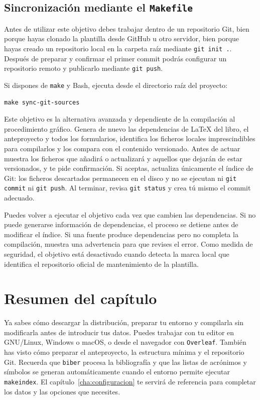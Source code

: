 \subsection{Sincronización mediante el \texttt{Makefile}}

Antes de utilizar este objetivo debes trabajar dentro de un repositorio Git, bien porque hayas clonado la plantilla desde GitHub u otro servidor, bien porque hayas creado un repositorio local en la carpeta raíz mediante \texttt{git init .}. Después de preparar y confirmar el primer commit podrás configurar un repositorio remoto y publicarlo mediante \texttt{git push}.

Si dispones de \texttt{make} y Bash, ejecuta desde el directorio raíz del proyecto:

\begin{verbatim}
make sync-git-sources
\end{verbatim}

Este objetivo es la alternativa avanzada y dependiente de la compilación al procedimiento gráfico. Genera de nuevo las dependencias de \LaTeX{} del libro, el anteproyecto y todos los formularios, identifica los ficheros locales imprescindibles para compilarlos y los compara con el contenido versionado. Antes de actuar muestra los ficheros que añadirá o actualizará y aquellos que dejarán de estar versionados, y te pide confirmación. Si aceptas, actualiza únicamente el índice de Git: los ficheros descartados permanecen en el disco y no se ejecutan ni \texttt{git commit} ni \texttt{git push}. Al terminar, revisa \texttt{git status} y crea tú mismo el commit adecuado.

Puedes volver a ejecutar el objetivo cada vez que cambien las dependencias. Si no puede generarse información de dependencias, el proceso se detiene antes de modificar el índice. Si una fuente produce dependencias pero no completa la compilación, muestra una advertencia para que revises el error. Como medida de seguridad, el objetivo está desactivado cuando detecta la marca local que identifica el repositorio oficial de mantenimiento de la plantilla.

\section{Resumen del capítulo}
\label{sec:resumen-primeros-pasos}

Ya sabes cómo descargar la distribución, preparar tu entorno y compilarla sin modificarla antes de introducir tus datos. Puedes trabajar con tu editor en GNU/Linux, Windows o macOS, o desde el navegador con \texttt{Overleaf}. También has visto cómo preparar el anteproyecto, la estructura mínima y el repositorio Git. Recuerda que \texttt{biber} procesa la bibliografía y que las listas de acrónimos y símbolos se generan automáticamente cuando el entorno permite ejecutar \texttt{makeindex}. El capítulo~\ref{cha:configuracion} te servirá de referencia para completar los datos y las opciones que necesites.


